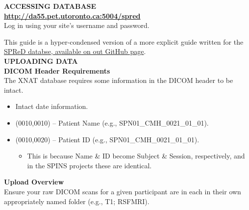 \documentclass[a4paper,11pt,oneside]{book}
\newcommand\titlesL{%
    \noindent
    \small
    \leftskip=0in
    \textbf
}
\newcommand\stepsL{
    \noindent
    \leftskip=0.15in
    \small
}
\begin{document}
%
\vspace{0.1in}
\begin{multicols}{2}

%
\noindent\leftskip=0in\large\textbf{ACCESSING DATABASE}\\

\titlesL{\url{http://da55.pet.utoronto.ca:5004/spred}} \\

\stepsL{Log in using your site's username and password.} \\

\stepsL{This guide is a hyper-condensed version of a more explicit guide written for the \href{https://github.com/TIGRLab/SPINS/blob/master/docs/guides/spred-upload-tutorial-v1.5.pdf?raw=true}{SPReD databse, available on out GitHub page}. \\

%
\noindent\leftskip=0in\large\textbf{UPLOADING DATA}\\

\titlesL{DICOM Header Requirements} \\

\stepsL{The XNAT database requires some information in the DICOM header to be intact.} \\

\stepsL{\begin{itemize}  
            \item{Intact date information.}  
            \item{(0010,0010) -- Patient Name (e.g., SPN01\_CMH\_0021\_01\_01).}  
            \item{(0010,0020) -- Patient ID (e.g., SPN01\_CMH\_0021\_01\_01).} 
            \begin{itemize}
                \item{This is because Name \& ID become Subject \& Session, respectively, and in the SPINS projects these are identical.}
            \end{itemize}
        \end{itemize}
        }

\titlesL{Upload Overview} \\

\stepsL{Ensure your raw DICOM scans for a given participant are in each in their own appropriately named folder (e.g., T1; RSFMRI).} \\

}
\end{multicols}
\end{document}
